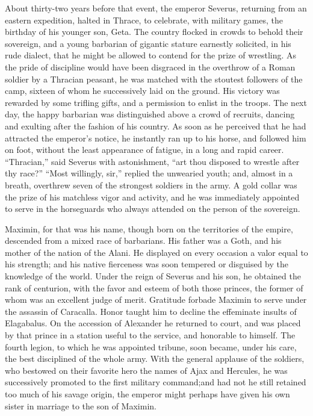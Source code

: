 About thirty-two years before that event, the emperor Severus,
returning from an eastern expedition, halted in Thrace, to
celebrate, with military games, the birthday of his younger son,
Geta. The country flocked in crowds to behold their sovereign,
and a young barbarian of gigantic stature earnestly solicited, in
his rude dialect, that he might be allowed to contend for the
prize of wrestling. As the pride of discipline would have been
disgraced in the overthrow of a Roman soldier by a Thracian
peasant, he was matched with the stoutest followers of the camp,
sixteen of whom he successively laid on the ground. His victory
was rewarded by some trifling gifts, and a permission to enlist
in the troops. The next day, the happy barbarian was
distinguished above a crowd of recruits, dancing and exulting
after the fashion of his country. As soon as he perceived that he
had attracted the emperor’s notice, he instantly ran up to his
horse, and followed him on foot, without the least appearance of
fatigue, in a long and rapid career. “Thracian,” said Severus
with astonishment, “art thou disposed to wrestle after thy race?”
“Most willingly, sir,” replied the unwearied youth; and, almost
in a breath, overthrew seven of the strongest soldiers in the
army. A gold collar was the prize of his matchless vigor and
activity, and he was immediately appointed to serve in the
horseguards who always attended on the person of the sovereign.\footnotemark[2]


Maximin, for that was his name, though born on the territories of
the empire, descended from a mixed race of barbarians. His father
was a Goth, and his mother of the nation of the Alani. He
displayed on every occasion a valor equal to his strength; and
his native fierceness was soon tempered or disguised by the
knowledge of the world. Under the reign of Severus and his son,
he obtained the rank of centurion, with the favor and esteem of
both those princes, the former of whom was an excellent judge of
merit. Gratitude forbade Maximin to serve under the assassin of
Caracalla. Honor taught him to decline the effeminate insults of
Elagabalus. On the accession of Alexander he returned to court,
and was placed by that prince in a station useful to the service,
and honorable to himself. The fourth legion, to which he was
appointed tribune, soon became, under his care, the best
disciplined of the whole army. With the general applause of the
soldiers, who bestowed on their favorite hero the names of Ajax
and Hercules, he was successively promoted to the first military
command;\footnotemark[3] and had not he still retained too much of his savage
origin, the emperor might perhaps have given his own sister in
marriage to the son of Maximin.\footnotemark[4]


